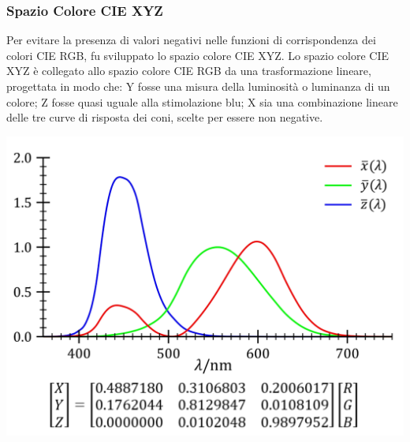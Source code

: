 \documentclass[a4paper,11pt]{article} %
\begin{document}
\subsubsection{Spazio Colore CIE XYZ}
\begin{minipage}{0.65\textwidth}
Per evitare la presenza di valori negativi nelle funzioni di corrispondenza dei colori CIE RGB, fu sviluppato lo spazio colore CIE XYZ. Lo spazio colore CIE XYZ è collegato allo spazio colore CIE RGB da una trasformazione lineare, progettata in modo che: Y fosse una misura della luminosità o luminanza di un colore; Z fosse quasi uguale alla stimolazione blu; X sia una combinazione lineare delle tre curve di risposta dei coni, scelte per essere non negative.
\end{minipage}
\begin{minipage}{0.05\textwidth}
\end{minipage}
\begin{minipage}{0.3\textwidth}
    \includegraphics[width=\linewidth]{XYZfunction}
\end{minipage}
\end{document}
